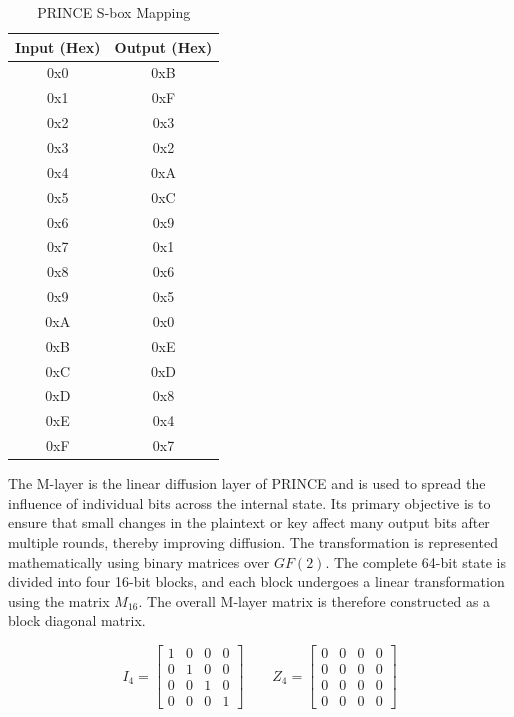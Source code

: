 \documentclass[12pt,a4paper]{report}
\begin{document}
\begin{table}[H]
\centering
\caption{PRINCE S-box Mapping}
\label{tab:classical_prince_sbox}
\begin{tabular}{|c|c|}
\hline
\textbf{Input (Hex)} & \textbf{Output (Hex)} \\
\hline
0x0 & 0xB \\
\hline
0x1 & 0xF \\
\hline
0x2 & 0x3 \\
\hline
0x3 & 0x2 \\
\hline
0x4 & 0xA \\
\hline
0x5 & 0xC \\
\hline
0x6 & 0x9 \\
\hline
0x7 & 0x1 \\
\hline
0x8 & 0x6 \\
\hline
0x9 & 0x5 \\
\hline
0xA & 0x0 \\
\hline
0xB & 0xE \\
\hline
0xC & 0xD \\
\hline
0xD & 0x8 \\
\hline
0xE & 0x4 \\
\hline
0xF & 0x7 \\
\hline
\end{tabular}
\end{table}

The M-layer is the linear diffusion layer of PRINCE and is used to spread the influence of individual bits across the internal state. Its primary objective is to ensure that small changes in the plaintext or key affect many output bits after multiple rounds, thereby improving diffusion. The transformation is represented mathematically using binary matrices over $GF(2)$. The complete 64-bit state is divided into four 16-bit blocks, and each block undergoes a linear transformation using the matrix $M_{16}$. The overall M-layer matrix is therefore constructed as a block diagonal matrix.

\[
I_4 =
\begin{bmatrix}
1 & 0 & 0 & 0 \\
0 & 1 & 0 & 0 \\
0 & 0 & 1 & 0 \\
0 & 0 & 0 & 1
\end{bmatrix}
\qquad
Z_4 =
\begin{bmatrix}
0 & 0 & 0 & 0 \\
0 & 0 & 0 & 0 \\
0 & 0 & 0 & 0 \\
0 & 0 & 0 & 0
\end{bmatrix}
\]
\end{document}

